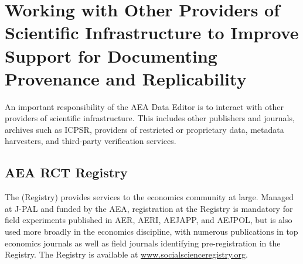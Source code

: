 
\section{Working with Other Providers of Scientific Infrastructure to Improve Support for Documenting Provenance and Replicability}
\label{sec:coordination}

An important responsibility of the AEA Data Editor is to interact with other providers of scientific infrastructure. This includes other publishers and journals, archives such as ICPSR, providers of restricted or proprietary data, metadata harvesters, and third-party verification services. 

\subsection{AEA RCT Registry}
\label{sec:registry}

The \rctr{} (Registry) provides services to the economics community at large. Managed at J-PAL and funded by the AEA, registration at the Registry is mandatory for field experiments published in \ac{AER}, \ac{AERI}, \ac{AEJAPP}, and \ac{AEJPOL}, but is also used more broadly in the economics discipline, with numerous publications in top economics journals as well as field journals identifying pre-registration in the Registry. The Registry is available at \href{https://www.socialscienceregistry.org/}{www.socialscienceregistry.org}.

